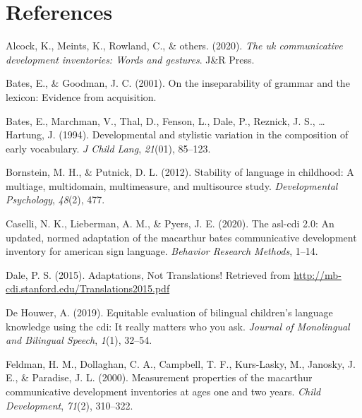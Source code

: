 \documentclass[
  english,
  man]{apa7}
\begin{document}
\newpage

\hypertarget{references}{%
\section{References}\label{references}}

\begingroup
\setlength{\parindent}{-0.5in}
\setlength{\leftskip}{0.5in}

\hypertarget{refs}{}
\leavevmode\hypertarget{ref-Alcock2020}{}%
Alcock, K., Meints, K., Rowland, C., \& others. (2020). \emph{The uk communicative development inventories: Words and gestures}. J\&R Press.

\leavevmode\hypertarget{ref-Bates2001}{}%
Bates, E., \& Goodman, J. C. (2001). On the inseparability of grammar and the lexicon: Evidence from acquisition.

\leavevmode\hypertarget{ref-bates1994}{}%
Bates, E., Marchman, V., Thal, D., Fenson, L., Dale, P., Reznick, J. S., \ldots{} Hartung, J. (1994). Developmental and stylistic variation in the composition of early vocabulary. \emph{J Child Lang}, \emph{21}(01), 85--123.

\leavevmode\hypertarget{ref-bornstein2012}{}%
Bornstein, M. H., \& Putnick, D. L. (2012). Stability of language in childhood: A multiage, multidomain, multimeasure, and multisource study. \emph{Developmental Psychology}, \emph{48}(2), 477.

\leavevmode\hypertarget{ref-Caselli2020}{}%
Caselli, N. K., Lieberman, A. M., \& Pyers, J. E. (2020). The asl-cdi 2.0: An updated, normed adaptation of the macarthur bates communicative development inventory for american sign language. \emph{Behavior Research Methods}, 1--14.

\leavevmode\hypertarget{ref-dale2015}{}%
Dale, P. S. (2015). Adaptations, Not Translations! Retrieved from \url{http://mb-cdi.stanford.edu/Translations2015.pdf}

\leavevmode\hypertarget{ref-DeHouwer2019}{}%
De Houwer, A. (2019). Equitable evaluation of bilingual children's language knowledge using the cdi: It really matters who you ask. \emph{Journal of Monolingual and Bilingual Speech}, \emph{1}(1), 32--54.

\leavevmode\hypertarget{ref-feldman2000}{}%
Feldman, H. M., Dollaghan, C. A., Campbell, T. F., Kurs-Lasky, M., Janosky, J. E., \& Paradise, J. L. (2000). Measurement properties of the macarthur communicative development inventories at ages one and two years. \emph{Child Development}, \emph{71}(2), 310--322.
\end{document}

